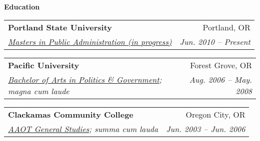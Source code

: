 \documentclass[letterpaper,11pt]{article}
\makeatletter
\newcommand{\resheading}[1]{{\large \colorbox{mygrey}{\begin{minipage}{\textwidth}{\textbf{#1 \vphantom{p\^{E}}}}\end{minipage}}}}
\newcommand{\ressubheading}[4]{
\begin{tabular*}{6.75in}{l@{\extracolsep{\fill}}r}
		\textbf{#1} & #2 \\
		\textit{#3} & \textit{#4} \\
\end{tabular*}\vspace{-6pt}}
\makeatother
\begin{document}
\resheading{Education}
	\begin{description}
		\item
			\ressubheading{Portland State University}{Portland, OR}{\href{http://www.pdx.edu/hatfieldschool/division-public-administratio}{Masters in Public Administration (in progress)} \textcolor{mygreylink}{}}{Jun. 2010 -- Present}
		\item
			\ressubheading{Pacific University}{Forest Grove, OR}{\href{http://www.pacificu.edu/as/politics}{Bachelor of Arts in Politics \& Government}; \textcolor{mygreylink}{magna cum laude}}{Aug. 2006 -- May. 2008}
		\item
			\ressubheading{Clackamas Community College}{Oregon City, OR}{\href{http://www.clackamas.edu/index.aspx}{AAOT General Studies}; \textcolor{mygreylink}{summa cum lauda}}{Jun. 2003 -- Jun. 2006}
	\end{description} %
\end{document}
